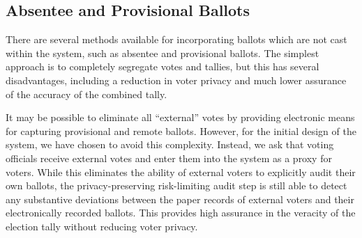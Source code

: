 \subsection{Absentee and Provisional Ballots}
There are several methods available for incorporating ballots which are not cast within the \projname system, such as absentee and provisional ballots.  The simplest approach is to completely segregate votes and tallies, but this has several disadvantages, including a reduction in voter privacy and much lower assurance of the accuracy of the combined tally.

It may be possible to eliminate all ``external'' votes by providing electronic means for capturing provisional and remote ballots.  However, for the initial design of the \projname system, we have chosen to avoid this complexity.  Instead, we ask that voting officials receive external votes and enter them into the \projname system as a proxy for voters.  While this eliminates the ability of external voters to explicitly audit their own ballots, the privacy-preserving risk-limiting audit step is still able to detect any substantive deviations between the paper records of external voters and their electronically recorded ballots.  This provides high assurance in the veracity of the election tally without reducing voter privacy.



